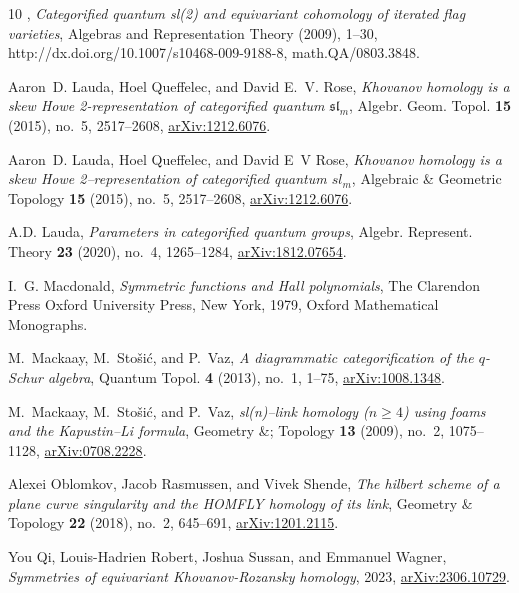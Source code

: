 \documentclass{amsart}
\numberwithin{equation}{section}
\theoremstyle{definition}
\begin{document}
\begin{thebibliography}{10}
\bysame, \emph{Categorified quantum sl(2) and equivariant cohomology of iterated flag varieties}, Algebras and Representation Theory (2009), 1--30, http://dx.doi.org/10.1007/s10468-009-9188-8, math.QA/0803.3848.

Aaron~D. Lauda, Hoel Queffelec, and David E.~V. Rose, \emph{Khovanov homology is a skew {H}owe 2-representation of categorified quantum {$\mathfrak{sl}_m$}}, Algebr. Geom. Topol. \textbf{15} (2015), no.~5, 2517--2608, \href{https://arxiv.org/abs/1212.6076}{arXiv:1212.6076}. 

Aaron~D. Lauda, Hoel Queffelec, and David E~V Rose, \emph{Khovanov homology is a skew {H}owe 2–representation of categorified quantum {$sl_m$}}, Algebraic \& Geometric Topology \textbf{15} (2015), no.~5, 2517–2608, \href{https://arxiv.org/abs/1212.6076}{arXiv:1212.6076}.

A.D. Lauda, \emph{Parameters in categorified quantum groups}, Algebr. Represent. Theory \textbf{23} (2020), no.~4, 1265--1284, \href{https://arxiv.org/abs/1812.07654}{arXiv:1812.07654}. 

I.~G. Macdonald, \emph{Symmetric functions and {H}all polynomials}, The Clarendon Press Oxford University Press, New York, 1979, Oxford Mathematical Monographs.

M.~Mackaay, M.~Sto{\v{s}i\'c}, and P.~Vaz, \emph{A diagrammatic categorification of the {$q$}-{S}chur algebra}, Quantum Topol. \textbf{4} (2013), no.~1, 1--75, \href{https://arxiv.org/abs/1008.1348}{arXiv:1008.1348}. 

M.~Mackaay, M.~Stošić, and P.~Vaz, \emph{sl(n)–link homology ($n \geq 4$) using foams and the {K}apustin–{L}i formula}, Geometry \&; Topology \textbf{13} (2009), no.~2, 1075–1128, \href{https://arxiv.org/abs/0708.2228}{arXiv:0708.2228}.

Alexei Oblomkov, Jacob Rasmussen, and Vivek Shende, \emph{The hilbert scheme of a plane curve singularity and the {HOMFLY} homology of its link}, Geometry \& Topology \textbf{22} (2018), no.~2, 645–691, \href{https://arxiv.org/abs/1201.2115}{arXiv:1201.2115}.

You Qi, Louis-Hadrien Robert, Joshua Sussan, and Emmanuel Wagner, \emph{Symmetries of equivariant {K}hovanov-{R}ozansky homology}, 2023, \href{https://arxiv.org/abs/2306.10729}{arXiv:2306.10729}.


\end{thebibliography}
\end{document}
